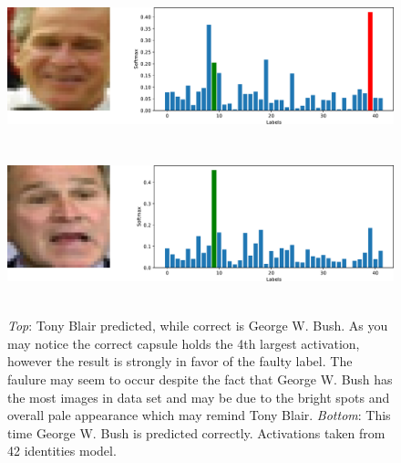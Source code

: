 \begin{figure}[ht]
    \centering
    \includegraphics[height=12em]{obrazky-figures/predicted_131_fail.pdf}
    \vspace{1em}
    \includegraphics[height=12em]{obrazky-figures/predicted_116_ok.pdf}
    \caption{\textit{Top}: Tony Blair predicted, while correct is George W. Bush. As you may notice the correct capsule holds the 4th largest activation, however the result is strongly in favor of the faulty label. The faulure may seem to occur despite the fact that George W. Bush has the most images in data set and may be due to the bright spots and overall pale appearance which may remind Tony Blair. \textit{Bottom}: This time George W. Bush is predicted correctly. Activations taken from 42 identities model.}
    \label{fig:bush}
\end{figure}

